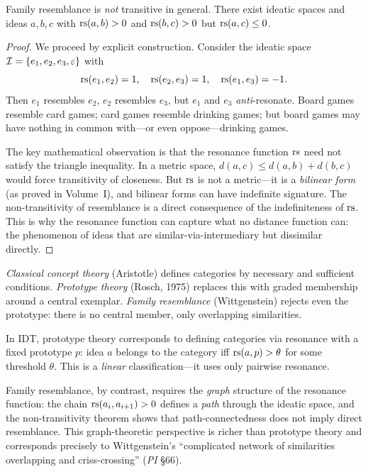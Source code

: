 \begin{theorem}
\label{thm:non-transitive}
Family resemblance is \emph{not} transitive in general. There exist ideatic
spaces and ideas $a, b, c$ with $\mathrm{rs}(a, b) > 0$ and $\mathrm{rs}(b, c) > 0$ but
$\mathrm{rs}(a, c) \leq 0$.
\end{theorem}

\begin{proof}
We proceed by explicit construction. Consider the ideatic space
$\mathcal{I} = \{e_1, e_2, e_3, \varepsilon\}$ with
\[
\mathrm{rs}(e_1, e_2) = 1, \quad \mathrm{rs}(e_2, e_3) = 1, \quad \mathrm{rs}(e_1, e_3) = -1.
\]
Then $e_1$ resembles $e_2$, $e_2$ resembles $e_3$, but $e_1$ and $e_3$
\emph{anti}-resonate. Board games resemble card games; card games resemble
drinking games; but board games may have nothing in common with---or even
oppose---drinking games.

The key mathematical observation is that the resonance function $\mathrm{rs}$
need not satisfy the triangle inequality. In a metric space,
$d(a,c) \leq d(a,b) + d(b,c)$ would force transitivity of closeness.
But $\mathrm{rs}$ is not a metric---it is a \emph{bilinear form} (as proved in
Volume~I), and bilinear forms can have indefinite signature. The non-transitivity
of resemblance is a direct consequence of the indefiniteness of $\mathrm{rs}$.
This is why the resonance function can capture what no distance function
can: the phenomenon of ideas that are similar-via-intermediary but
dissimilar directly.
\end{proof}

\begin{interpretation}
\emph{Classical concept theory} (Aristotle) defines categories by
necessary and sufficient conditions. \emph{Prototype theory} (Rosch, 1975)
replaces this with graded membership around a central exemplar.
\emph{Family resemblance} (Wittgenstein) rejects even the prototype: there
is no central member, only overlapping similarities.

In IDT, prototype theory corresponds to defining categories via resonance
with a fixed prototype $p$: idea $a$ belongs to the category iff
$\mathrm{rs}(a, p) > \theta$ for some threshold $\theta$. This is a \emph{linear}
classification---it uses only pairwise resonance.

Family resemblance, by contrast, requires the \emph{graph} structure of
the resonance function: the chain $\mathrm{rs}(a_i, a_{i+1}) > 0$ defines a
\emph{path} through the ideatic space, and the non-transitivity theorem
shows that path-connectedness does not imply direct resemblance. This
graph-theoretic perspective is richer than prototype theory and corresponds
precisely to Wittgenstein's ``complicated network of similarities
overlapping and criss-crossing'' (\emph{PI} \S66).
\end{interpretation}

